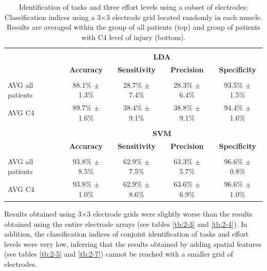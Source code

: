 \begin{table}[]
\centering
\caption{Identification of tasks and three effort levels using a subset of electrodes: Classification indices using a 3$\times$3 electrode grid located randomly in each muscle. Results are averaged within the group of all patients (top) and group of patients with C4 level of injury (bottom).}
\label{tb:2-10}
\begin{tabular}{lcccc}
 & & & &\\
                 & \multicolumn{4}{c}{\large{\textbf{LDA}}}                                                      \\
                 & \textbf{Accuracy}  & \textbf{Sensitivity} & \textbf{Precision} & \textbf{Specificity} \\ \hline
                 &                    &                      &                    &                      \\
AVG all patients & 88.1\% $\pm$ 1.3\% & 28.7\% $\pm$ 7.4\% & 28.3\% $\pm$ 6.4\% & 93.5\% $\pm$ 1.5\% \\
AVG C4           & 89.7\% $\pm$ 1.6\% & 38.4\% $\pm$ 9.1\% & 38.8\% $\pm$ 9.1\% & 94.4\% $\pm$ 1.6\% \\
                 &                    &                      &                    &                      \\
                 & \multicolumn{4}{c}{\large{\textbf{SVM}}}                                                      \\
                 & \textbf{Accuracy}  & \textbf{Sensitivity} & \textbf{Precision} & \textbf{Specificity} \\ \hline
                 &                    &                      &                    &                      \\
AVG all patients & 93.8\% $\pm$ 8.5\% & 62.9\% $\pm$ 7.5\% & 63.3\% $\pm$ 5.7\% & 96.6\% $\pm$ 0.8\% \\
AVG C4           & 93.8\% $\pm$ 1.0\% & 62.9\% $\pm$ 8.6\% & 63.6\% $\pm$ 6.9\% & 96.6\% $\pm$ 1.0\%
\end{tabular}
\end{table}

Results obtained using 3$\times$3 electrode grids were slightly worse than the results obtained using the entire electrode arrays (see tables \ref{tb:2-3} and \ref{tb:2-4}). In addition, the classification indices of conjoint identification of tasks and effort levels were very low, inferring that the results obtained by adding spatial features (see tables \ref{tb:2-5} and \ref{tb:2-7}) cannot be reached with a smaller grid of electrodes.


